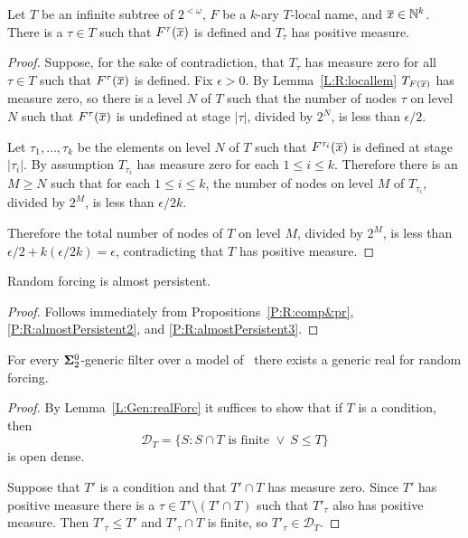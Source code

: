 \begin{prop}[\RCAo]\label{P:R:almostPersistent3}
Let $T$ be an infinite subtree of $2^{<\omega}$,
$F$ be a $k$-ary $T$-local name, and $\overline{x}\in\mathbb{N}^k$.
There is a $\tau\in T$ such that $F^\tau(\overline{x})$ is defined
and $T_\tau$ has positive measure.
\end{prop}

\begin{proof}
Suppose, for the sake of contradiction, that $T_\tau$ has measure zero
for all $\tau\in T$ such that $F^\tau(\overline{x})$ is defined.
Fix $\epsilon>0$.
By Lemma~\ref{L:R:locallem} $T_{F(\overline{x})}$ has measure zero,
so there is a level $N$ of $T$ such that the number of nodes $\tau$ on level
$N$ such that $F^\tau(\overline{x})$ is undefined at stage $|\tau|$,
divided by $2^N$, is less than $\epsilon/2$.

Let $\tau_1,\ldots,\tau_k$ be the elements on level $N$ of $T$
such that $F^{\tau_i}(\overline{x})$ is defined at stage $|\tau_i|$.
By assumption $T_{\tau_i}$ has measure zero for each $1\leq i\leq k$.
Therefore there is an $M\geq N$ such that for each $1\leq i\leq k$,
the number of nodes on level $M$ of $T_{\tau_i}$, divided by $2^M$,
is less than $\epsilon/2k$.

Therefore the total number of nodes of $T$ on level $M$, divided by $2^M$,
is less than $\epsilon/2+k(\epsilon/2k)=\epsilon$, contradicting that
$T$ has positive measure.
\end{proof}

\begin{cor}[\RCAo]\label{C:R:almost persistent}
Random forcing is almost persistent.
\end{cor}
\begin{proof}
Follows immediately from Propositions~\ref{P:R:comp&pr}, \ref{P:R:almostPersistent2}, and \ref{P:R:almostPersistent3}.
\end{proof}

\begin{lem}\label{L:R:realForc}
For every $\mathbf{\Sigma}^0_2$-generic filter over a model of \RCAo\
there exists a generic real for random forcing.
\end{lem}

\begin{proof}
By Lemma~\ref{L:Gen:realForc} it
suffices to show that if $T$ is a condition, then
$$\mathcal{D}_T=\{S:S\cap T\text{ is finite }\lor\ S\leq T\}$$
is open dense.

Suppose that $T'$ is a condition and that
$T'\cap T$ has measure zero.
Since $T'$ has positive measure
there is a $\tau\in T'\setminus(T'\cap T)$ such that $T'_\tau$ also has positive measure.
Then $T'_\tau\leq T'$ and $T'_\tau\cap T$ is finite,
so $T'_\tau\in\mathcal{D}_T$.
\end{proof}

